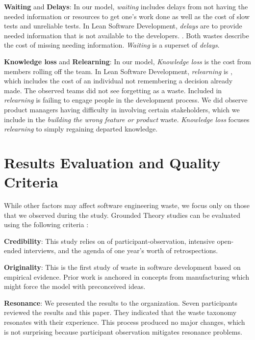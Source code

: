 \textbf{Waiting} and \textbf{Delays}: In our model, \textit{waiting} includes delays from not having the needed information or resources to get one's work done as well as the cost of slow tests and unreliable tests. In Lean Software Development, \textit{delays} are  to provide needed information that is not available to the developers. \cite{PoppendieckConceptToCash}. Both wastes describe the cost of missing needing information. \textit{Waiting} is a superset of \textit{delays}.

\textbf{Knowledge loss} and \textbf{Relearning}:
In our model, \textit{Knowledge loss} is the cost from members rolling off the team. In Lean Software Development, \textit{relearning} is  \cite{PoppendieckConceptToCash}, which includes the cost of an individual not remembering a decision already made. The observed teams did not see forgetting as a waste.  Included in \textit{relearning} is failing to engage people in the development process. We did observe product managers having difficulty in involving certain stakeholders, which we include in the \textit{building the wrong feature or product} waste. \textit{Knowledge loss} focuses \textit{relearning} to simply regaining departed knowledge. 
\section{Results Evaluation and Quality Criteria}
\label{ResultsEvaluation}
While other factors may affect software engineering waste, we focus only on those that we observed during the study. Grounded Theory studies can be evaluated using the following criteria \cite{Charmaz, StolGroundedTheory}:

\textbf{Credibility}:   This study relies on \durationOfResearchStudyPlural{} of participant-observation, \numberOfInterviews{} intensive open-ended interviews, and the agenda of one year's worth of retrospections. 

\textbf{Originality}:   This is the first study of waste in software development based on empirical evidence. Prior work is anchored in concepts from manufacturing which might force the model with preconceived ideas. 

\textbf{Resonance}:  We presented the results to the organization. Seven participants reviewed the results and this paper. They indicated that the waste taxonomy resonates with their experience.    This process produced no major changes, which is not surprising because participant observation mitigates resonance problems.

